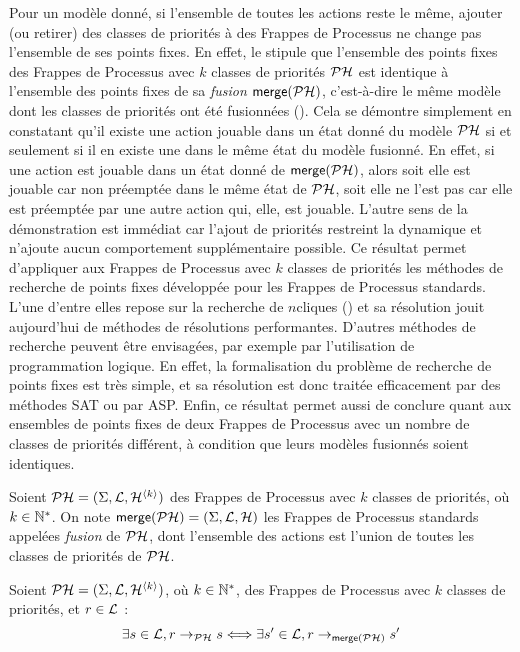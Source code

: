 Pour un modèle donné, si l'ensemble de toutes les actions reste le même,
ajouter (ou retirer) des classes de priorités à des Frappes de Processus ne change pas
l'ensemble de ses points fixes.
En effet, le  stipule que
l'ensemble des points fixes des Frappes de Processus avec $k$
classes de priorités $\mathcal{PH}$ est identique à l'ensemble des points fixes de
sa \emph{fusion} $\mathsf{merge}(\mathcal{PH})$,
c'est-à-dire le même modèle dont les classes de priorités ont été fusionnées
().
Cela se démontre simplement en constatant qu'il existe une action jouable dans un état donné du
modèle $\mathcal{PH}$ si et seulement si il en existe une dans le même état du modèle fusionné.
En effet, si une action est jouable dans un état donné de $\mathsf{merge}(\mathcal{PH})$,
alors soit elle est jouable car non préemptée dans le même état de $\mathcal{PH}$,
soit elle ne l'est pas car elle est préemptée par une autre action qui, elle, est jouable.
L'autre sens de la démonstration est immédiat car l'ajout de priorités restreint la dynamique
et n'ajoute aucun comportement supplémentaire possible.
Ce résultat permet d'appliquer aux Frappes de Processus avec $k$ classes de priorités
les méthodes de recherche de points fixes développée pour les Frappes de Processus standards.
L'une d'entre elles repose sur la recherche de $n$\nbd cliques ()
et sa résolution jouit aujourd'hui de méthodes de résolutions performantes.
D'autres méthodes de recherche peuvent être envisagées,
par exemple par l'utilisation de programmation logique.
En effet, la formalisation du problème de recherche de points fixes est très simple,
et sa résolution est donc traitée efficacement par des méthodes SAT ou par ASP.
Enfin, ce résultat permet aussi de conclure quant aux ensembles de points fixes de deux Frappes
de Processus avec un nombre de classes de priorités différent, à condition que
leurs modèles fusionnés soient identiques.

\begin{definition}
  Soient $\mathcal{PH} = (\Sigma, \mathcal{L}, \mathcal{H}^{{\langle k \rangle}})$ des Frappes de Processus avec $k$
  classes de priorités, où $k \in \mathbb{N}^*$.
  On note $\mathsf{merge}(\mathcal{PH}) = (\Sigma, \mathcal{L}, \mathcal{H})$
  les Frappes de Processus standards appelées \emph{fusion} de $\mathcal{PH}$,
  dont l'ensemble des actions est l'union de toutes les classes de priorités de $\mathcal{PH}$.
\end{definition}

\begin{theorem}
  Soient $\mathcal{PH} = (\Sigma, \mathcal{L}, \mathcal{H}^{{\langle k \rangle}})$, où $k \in \mathbb{N}^*$,
  des Frappes de Processus avec $k$ classes de priorités,
  et $r \in \mathcal{L}$ :
  \[\exists s \in \mathcal{L}, r \rightarrow_{\mathcal{PH}} s \Longleftrightarrow
    \exists s' \in \mathcal{L}, r \rightarrow_{\mathsf{merge}(\mathcal{PH})} s'\]
\end{theorem}

